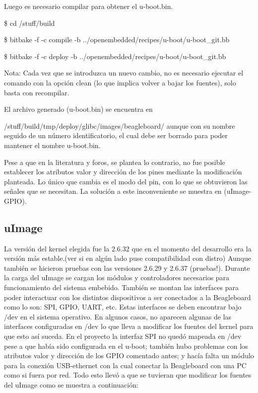 Luego es necesario compilar para obtener el u-boot.bin.

\bigskip
\centerline{\$ cd /stuff/build}

\centerline{\$ bitbake -f -c compile -b ../openembedded/recipes/u-boot/u-boot\_git.bb}

\centerline{\$ bitbake -f -c deploy -b ../openembedded/recipes/u-boot/u-boot\_git.bb}

\bigskip
Nota: Cada vez que se introduzca un nuevo cambio, no es necesario ejecutar el comando con la opción clean (lo que implica volver a bajar los fuentes), solo basta con recompilar.

\bigskip
El archivo generado (u-boot.bin) se encuentra en 

/stuff/build/tmp/deploy/glibc/images/beagleboard/ aunque con su nombre seguido de un número identificatorio, el cual debe ser borrado para poder mantener el nombre u-boot.bin.

\bigskip
Pese a que en la literatura y foros, se plantea lo contrario, no fue posible establecer los atributos valor y dirección de los pines mediante la modificación planteada. Lo único que cambia es el modo del pin, con lo que se obtuvieron las señales que se necesitan. La solución a este inconveniente se muestra en (uImage-GPIO).


\subsection{uImage}
La versión del kernel elegida fue la 2.6.32 que en el momento del desarrollo era la versión más estable.(ver si en algún lado puse compatibilidad con distro) Aunque también se hicieron pruebas con las versiones 2.6.29 y 2.6.37 (pruebas!).
Durante la carga del uImage se cargan los módulos y controladores necesarios para funcionamiento del sistema embebido. También se montan las interfaces para poder interactuar con los distintos dispositivos a ser conectados a la Beagleboard como lo son: SPI, GPIO, UART, etc. Estas interfaces se deben encontrar bajo /dev en el sistema operativo. En algunos casos, no aparecen algunas de las interfaces configuradas en /dev lo que lleva a modificar los fuentes del kernel para que esto así suceda. En el proyecto la interfaz SPI no quedó mapeada en /dev pese a que había sido configurada en el u-boot; también hubo problemas con los atributos valor y dirección de los GPIO comentado antes; y hacía falta un módulo para la conexión USB-ethernet con la cual conectar la Beagleboard con una PC como si fuera por red. Todo esto llevó a que se tuvieran que modificar los fuentes del uImage como se muestra a continuación:
 
